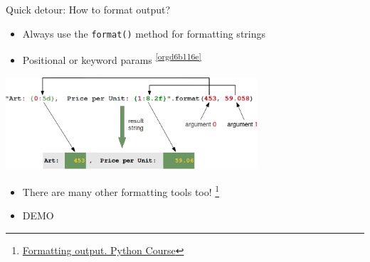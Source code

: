 \documentclass[presentation]{beamer}
\begin{document}
\begin{frame}[label={sec:org7eb87fc},fragile]{Quick detour: How to format output?}
 \begin{itemize}
\item Always use the \texttt{format()} method for formatting strings
\item Positional or keyword params \textsuperscript{\ref{orgd6b116e}}
\end{itemize}
\begin{center}
\includegraphics[width=0.7\textwidth]{images/format_method_positional_parameters.png}
\end{center}
\begin{itemize}
\item There are many other formatting tools too! \footnote{\href{https://www.python-course.eu/python3\_formatted\_output.php}{Formatting output. Python Course}}
\item \alert{DEMO}
\end{itemize}
\end{frame}
\end{document}
